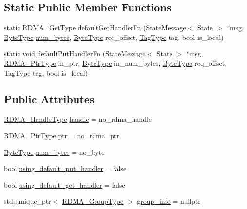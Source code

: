\subsection*{Static Public Member Functions}
\begin{DoxyCompactItemize}
\item 
static \hyperlink{namespacevt_a1cab7f4860f65a49ad2c042d6240f288}{R\+D\+M\+A\+\_\+\+Get\+Type} \hyperlink{structvt_1_1rdma_1_1_state_a1bf31d5a7099c678a004b12e374ad220}{default\+Get\+Handler\+Fn} (\hyperlink{structvt_1_1rdma_1_1_state_message}{State\+Message}$<$ \hyperlink{structvt_1_1rdma_1_1_state}{State} $>$ $\ast$msg, \hyperlink{namespacevt_aab8d55968084610ce3b17057981e9300}{Byte\+Type} \hyperlink{structvt_1_1rdma_1_1_state_a0c249d4fe06c8ec521ac6f68b064e8a2}{num\+\_\+bytes}, \hyperlink{namespacevt_aab8d55968084610ce3b17057981e9300}{Byte\+Type} req\+\_\+offset, \hyperlink{namespacevt_a84ab281dae04a52a4b243d6bf62d0e52}{Tag\+Type} tag, bool is\+\_\+local)
\item 
static void \hyperlink{structvt_1_1rdma_1_1_state_a529be951a782923d38158859111897cd}{default\+Put\+Handler\+Fn} (\hyperlink{structvt_1_1rdma_1_1_state_message}{State\+Message}$<$ \hyperlink{structvt_1_1rdma_1_1_state}{State} $>$ $\ast$msg, \hyperlink{namespacevt_aab05b4a584f7ee835a6d0f66915cf59b}{R\+D\+M\+A\+\_\+\+Ptr\+Type} in\+\_\+ptr, \hyperlink{namespacevt_aab8d55968084610ce3b17057981e9300}{Byte\+Type} in\+\_\+num\+\_\+bytes, \hyperlink{namespacevt_aab8d55968084610ce3b17057981e9300}{Byte\+Type} req\+\_\+offset, \hyperlink{namespacevt_a84ab281dae04a52a4b243d6bf62d0e52}{Tag\+Type} tag, bool is\+\_\+local)
\end{DoxyCompactItemize}
\subsection*{Public Attributes}
\begin{DoxyCompactItemize}
\item 
\hyperlink{namespacevt_a10442579ec4e7ebef223818e64bcf908}{R\+D\+M\+A\+\_\+\+Handle\+Type} \hyperlink{structvt_1_1rdma_1_1_state_ac6ea5c9dffcc795713d1766b1c3e7028}{handle} = no\+\_\+rdma\+\_\+handle
\item 
\hyperlink{namespacevt_aab05b4a584f7ee835a6d0f66915cf59b}{R\+D\+M\+A\+\_\+\+Ptr\+Type} \hyperlink{structvt_1_1rdma_1_1_state_a60bb2c1f277de56d89e741f87e944c93}{ptr} = no\+\_\+rdma\+\_\+ptr
\item 
\hyperlink{namespacevt_aab8d55968084610ce3b17057981e9300}{Byte\+Type} \hyperlink{structvt_1_1rdma_1_1_state_a0c249d4fe06c8ec521ac6f68b064e8a2}{num\+\_\+bytes} = no\+\_\+byte
\item 
bool \hyperlink{structvt_1_1rdma_1_1_state_ad3d72847190c02761393d124cb07a917}{using\+\_\+default\+\_\+put\+\_\+handler} = false
\item 
bool \hyperlink{structvt_1_1rdma_1_1_state_ab8fc994adb5e3a106657fff53efd34a8}{using\+\_\+default\+\_\+get\+\_\+handler} = false
\item 
std\+::unique\+\_\+ptr$<$ \hyperlink{structvt_1_1rdma_1_1_state_aec26643b760f80a59e0c07c580e99ebc}{R\+D\+M\+A\+\_\+\+Group\+Type} $>$ \hyperlink{structvt_1_1rdma_1_1_state_ad8dc4c1a674c5a0b14789a53e54815d3}{group\+\_\+info} = nullptr
\end{DoxyCompactItemize}
